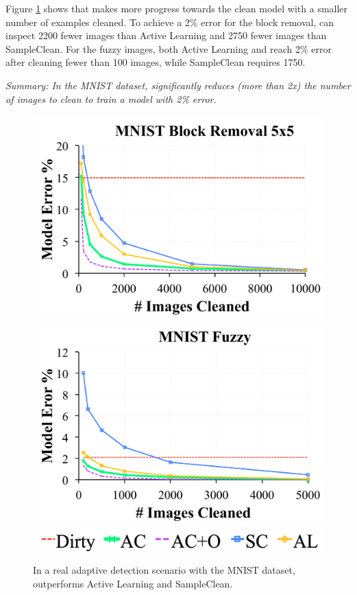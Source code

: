 Figure \ref{mnist} shows that \sys makes more progress towards the clean model with a smaller number of examples cleaned.
To achieve a 2\% error for the block removal, \sys can inspect 2200 fewer images than Active Learning and 2750 fewer images than SampleClean.
For the fuzzy images, both Active Learning and \sys reach 2\% error after cleaning fewer than 100 images, while SampleClean requires 1750.

\vspace{0.25em}

\noindent \emph{Summary: In the MNIST dataset, \sys significantly reduces (more than 2x) the number of images to clean to train a model with 2\% error. }

\begin{figure}[t]
\centering
 \includegraphics[width=0.49\columnwidth]{exp/exp7a.pdf}
 \includegraphics[width=0.49\columnwidth]{exp/exp7b.pdf}
 \includegraphics[width=0.49\columnwidth]{exp/legend-general.png}\vspace{-0.5em}
 \caption{In a real adaptive detection scenario with the MNIST dataset, \sys outperforms Active Learning and SampleClean.  \label{mnist}}\vspace{-1em}
\end{figure}
